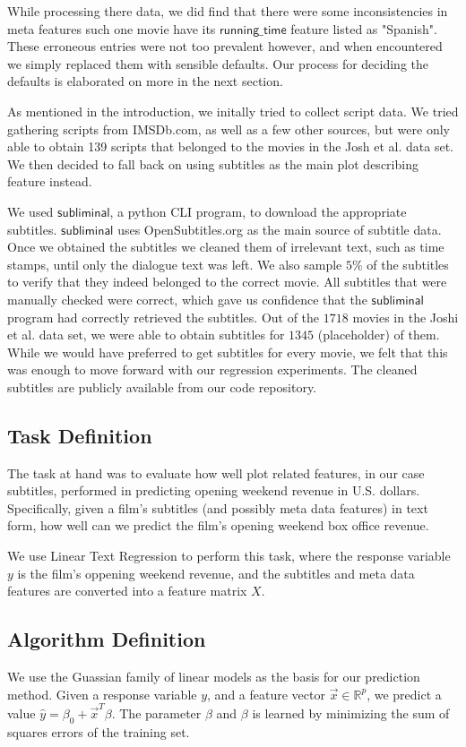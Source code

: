 \documentclass[11pt]{article}
\begin{document}
While processing there data, we 
did find that there were some inconsistencies in meta features such one movie
have its $\mathsf{running\_time}$ feature listed as "Spanish". These erroneous entries
were not too prevalent however, and when encountered we simply replaced them with
sensible defaults. Our process for deciding the defaults is elaborated on more in the
next section.

As mentioned in the introduction, we initally tried to collect script data. We tried
gathering scripts from IMSDb.com, as well as a few other sources, but were only able
to obtain 139 scripts that belonged to the movies in the Josh et al. data set. We then
decided to fall back on using subtitles as the main plot describing feature instead.

We used $\mathsf{subliminal}$, a python CLI program, to download the appropriate
subtitles. $\mathsf{subliminal}$ uses OpenSubtitles.org as the main source of subtitle
data. Once we obtained the subtitles we cleaned them of irrelevant text, such as time
stamps, until only the dialogue text was left. We also sample $5$\% of the subtitles to
verify that they indeed belonged to the correct movie. All subtitles that were manually
checked were correct, which gave us confidence that the $\mathsf{subliminal}$ program
had correctly retrieved the subtitles. Out of the $1718$ movies in the Joshi
et al. data set, we were able to obtain subtitles for $1345$ (placeholder) of them.
While we would have preferred to get subtitles for every movie, we felt that this was
enough to move forward with our regression experiments. The cleaned subtitles are
publicly available from our code repository.

\subsection{Task Definition}
The task at hand was to evaluate how well plot related features, in our case subtitles,
performed in predicting opening weekend revenue in U.S. dollars. Specifically, given
a film's subtitles (and possibly meta data features) in text form, how well can we
predict the film's opening weekend box office revenue.

We use Linear Text Regression to perform this task, where the response variable $y$ is
the film's oppening weekend revenue, and the subtitles and meta data features are
converted into a feature matrix $X$.

\subsection{Algorithm Definition}
We use the Guassian family of linear models as the basis for our prediction method.
Given a response variable $y$, and a feature vector $\vec{x} \in \mathbb{R}^p$, we
predict a value $\hat{y} = \beta_0 + \vec{x}^T \beta$. The parameter $\beta$ and $\beta$
is learned by minimizing the sum of squares errors of the training set.
\end{document}
